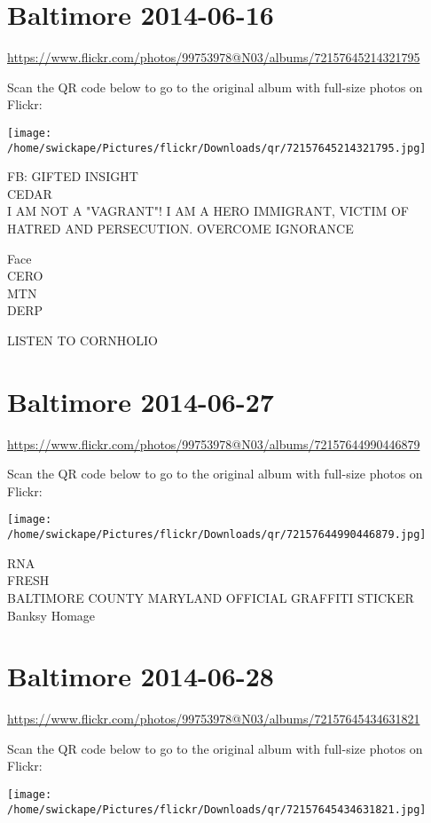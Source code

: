 \documentclass[10pt,letterpaper]{article}
\begin{document}
\section*{Baltimore 2014-06-16}

\url{https://www.flickr.com/photos/99753978@N03/albums/72157645214321795}

Scan the QR code below to go to the original album with full-size photos on Flickr:

\texttt{[image: /home/swickape/Pictures/flickr/Downloads/qr/72157645214321795.jpg]}
\pagebreak

FB: GIFTED INSIGHT\\
CEDAR\\
I AM NOT A "VAGRANT"!  I AM A HERO IMMIGRANT, VICTIM OF HATRED AND PERSECUTION.  OVERCOME IGNORANCE

Face\\
CERO\\
MTN\\
DERP

LISTEN TO CORNHOLIO
\pagebreak

\section*{Baltimore 2014-06-27}

\url{https://www.flickr.com/photos/99753978@N03/albums/72157644990446879}

Scan the QR code below to go to the original album with full-size photos on Flickr:

\texttt{[image: /home/swickape/Pictures/flickr/Downloads/qr/72157644990446879.jpg]}
\pagebreak

RNA\\
FRESH\\
BALTIMORE COUNTY MARYLAND OFFICIAL GRAFFITI STICKER\\
Banksy Homage
\pagebreak

\section*{Baltimore 2014-06-28}

\url{https://www.flickr.com/photos/99753978@N03/albums/72157645434631821}

Scan the QR code below to go to the original album with full-size photos on Flickr:

\texttt{[image: /home/swickape/Pictures/flickr/Downloads/qr/72157645434631821.jpg]}
\pagebreak
\end{document}
